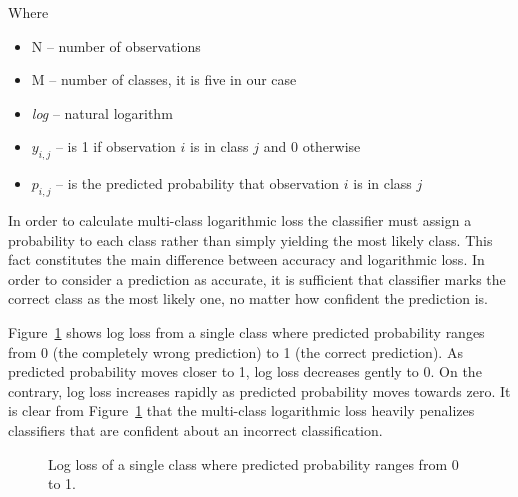 \documentclass[a4paper, 11pt, table]{article}
\begin{document}
Where 
\begin{itemize}
\item N -- number of observations
\item M -- number of classes, it is five in our case
\item \textit{log} -- natural logarithm
\item $y_{i,j}$ -- is 1 if observation $i$ is in class $j$ and 0 otherwise
\item $p_{i,j}$ --  is the predicted probability that observation $i$ is in class $j$
\end{itemize}

In order to calculate multi-class logarithmic loss the classifier must assign a probability to each class rather than simply yielding the most likely class. This fact constitutes the main difference between accuracy and logarithmic loss. In order to consider a prediction as accurate, it is sufficient that classifier marks the correct class as the most likely one, no matter how confident the prediction is.

Figure~\ref{fig:logloss} shows log loss from a single class where predicted probability ranges from 0 (the completely wrong prediction) to 1 (the correct prediction). As predicted probability moves closer to 1, log loss decreases gently to 0. On the contrary, log loss increases rapidly as predicted probability moves towards zero. It is clear from Figure~\ref{fig:logloss} that the multi-class logarithmic loss heavily penalizes classifiers that are confident about an incorrect classification.

\begin{figure}[H]
\centering
{}
\caption{\label{fig:logloss} Log loss of a single class where predicted probability ranges from 0 to 1. }
\end{figure}
\end{document}
